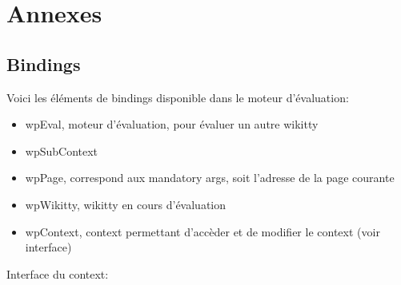 \section{Annexes}

\subsection*{Bindings}

Voici les éléments de bindings disponible dans le moteur d'évaluation:
	
\begin{itemize}
\item wpEval, moteur d'évaluation, pour évaluer un autre wikitty
\item wpSubContext
\item wpPage, correspond aux mandatory args, soit l'adresse de la page courante
\item wpWikitty, wikitty en cours d'évaluation
\item wpContext, context permettant d'accèder et de modifier le context (voir interface)
\end{itemize}

Interface du context:



